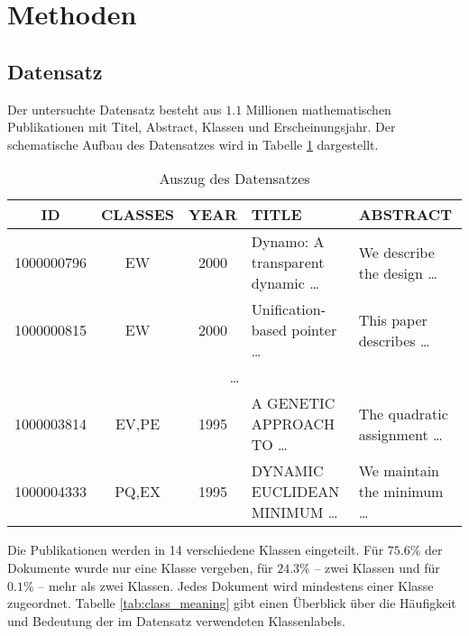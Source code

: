 \section{Methoden}


\subsection{Datensatz}
\label{sub:datensatz}
Der untersuchte Datensatz besteht aus $1.1$ Millionen mathematischen Publikationen mit Titel, Abstract, Klassen und Erscheinungsjahr.
Der schematische Aufbau des Datensatzes wird in Tabelle \ref{tab:data} dargestellt.

\begin{table}[h]
    \begin{tabular}{cccll}
        \tiny\textbf{ID} &\tiny \textbf{CLASSES} &\tiny \textbf{YEAR} &\tiny \textbf{TITLE} & \tiny \textbf{ABSTRACT} \\
        \hline
        \tiny 1000000796 &\tiny EW & \tiny 2000 & \tiny Dynamo: A transparent dynamic \dots  & \tiny We describe the design \dots \\
        \tiny 1000000815 &\tiny EW & \tiny 2000 & \tiny Unification-based pointer \dots  & \tiny This paper describes \dots \\
        \multicolumn{5}{c}{\dots} \\
        \tiny 1000003814 &\tiny EV,PE & \tiny 1995 & \tiny A GENETIC APPROACH TO \dots  & \tiny The quadratic assignment \dots \\
        \tiny 1000004333 & \tiny PQ,EX &\tiny 1995 &\tiny DYNAMIC EUCLIDEAN MINIMUM \dots & \tiny We maintain the minimum \dots \\
    \end{tabular}
    \caption{Auszug des Datensatzes}
    \label{tab:data}
\end{table}


Die Publikationen werden in 14 verschiedene Klassen eingeteilt.
Für $75.6 \%$ der Dokumente wurde nur eine Klasse vergeben, für $24.3 \%$ -- zwei Klassen und für $0.1 \%$ -- mehr als zwei Klassen.
Jedes Dokument wird mindestens einer Klasse zugeordnet.
Tabelle \ref{tab:class_meaning} gibt einen Überblick über die Häufigkeit und Bedeutung der im Datensatz verwendeten Klassenlabels.



